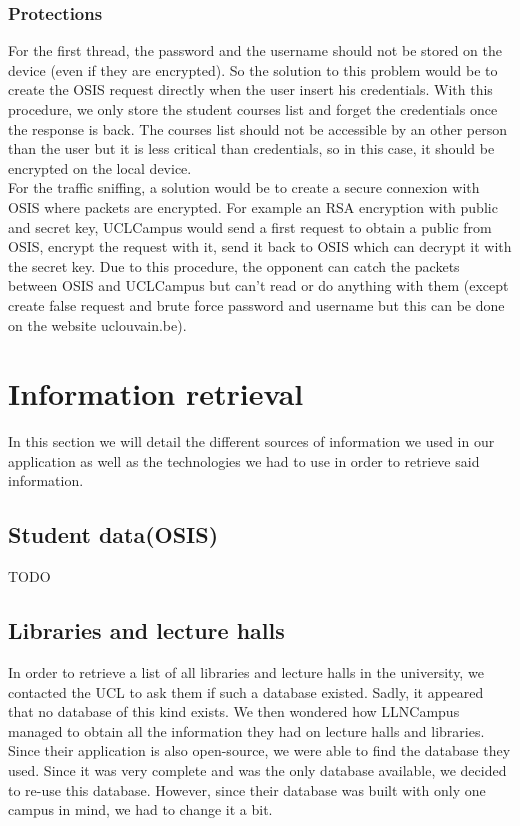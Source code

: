 \documentclass[11pt, a4paper]{report}
\begin{document}
\subsubsection{Protections}
For the first thread, the password and the username should not be stored on the device (even if they are encrypted). So the solution to this problem would be to create the OSIS request directly when the user insert his credentials. With this procedure, we only store the student courses list and forget the credentials once the response is back. The courses list should not be accessible by an other person than the user but it is less critical than credentials, so in this case, it should be encrypted on the local device. \\
For the traffic sniffing, a solution would be to create a secure connexion with OSIS where packets are encrypted. For example an RSA encryption with public and secret key, UCLCampus would send a first request to obtain a public from OSIS, encrypt the request with it, send it back to OSIS which can decrypt it with the secret key. Due to this procedure, the opponent can catch the packets between OSIS and UCLCampus but can't read or do anything with them (except create false request and brute force password and username but this can be done on the website uclouvain.be).
\section{Information retrieval}

In this section we will detail the different sources of information we used in our application as well as the technologies we had to use in order to retrieve said information. 
\subsection{Student data(OSIS)}
TODO
\subsection{Libraries and lecture halls}

In order to retrieve a list of all libraries and lecture halls in the university, we contacted the UCL to ask them if such a database existed. Sadly, it appeared that no database of this kind exists. We then wondered how LLNCampus managed to obtain all the information they had on lecture halls and libraries. Since their application is also open-source, we were able to find the database they used. Since it was very complete and was the only database available, we decided to re-use this database. However, since their database was built with only one campus in mind, we had to change it a bit.
\end{document}

